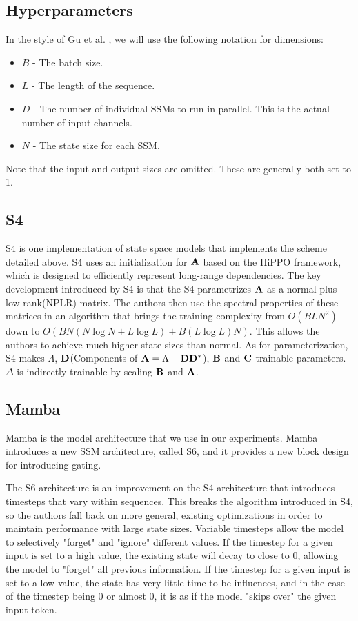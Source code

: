 \subsection{Hyperparameters}
In the style of Gu et al. \cite{s4}, we will use the following notation for
dimensions:
\begin{itemize}
    \item $B$ - The batch size.
    \item $L$ - The length of the sequence.
    \item $D$ - The number of individual SSMs to run in parallel. This is the
    actual number of input channels.
    \item $N$ - The state size for each SSM.
\end{itemize}
Note that the input and output sizes are omitted.
These are generally both set to 1.

\subsection{S4}
S4\cite{s4} is one implementation of state space models that implements the
scheme detailed above.
S4 uses an initialization for ${\mathbf{A}}$ based on the HiPPO framework, which is
designed to efficiently represent long-range dependencies.
The key development introduced by S4 is that the S4 parametrizes ${\mathbf{A}}$ as a
normal-plus-low-rank(NPLR) matrix. The authors then use the spectral properties
of these matrices in an algorithm that brings the training complexity from
$O(BLN^2)$ down to $O(BN(N \log N + L \log L) + B(L \log L)N)$\cite{s4}.
This allows the authors to achieve much higher state sizes than normal.
As for parameterization, S4 makes $\Lambda$, ${\mathbf{D}}$(Components of
${\mathbf{A}} = \Lambda - {\mathbf{D}}{\mathbf{D}}^*$), ${\mathbf{B}}$ and ${\mathbf{C}}$ trainable parameters.
$\Delta$ is indirectly trainable by scaling ${\mathbf{B}}$ and ${\mathbf{A}}$.

\subsection{Mamba}
Mamba\cite{mamba} is the model architecture that we use in our experiments.
Mamba introduces a new SSM architecture, called S6, and it provides a new block
design for introducing gating.

The S6 architecture is an improvement on the S4 architecture that introduces
timesteps that vary within sequences.
This breaks the algorithm introduced in S4, so the authors fall back on more
general, existing optimizations in order to maintain performance with large
state sizes.
Variable timesteps allow the model to selectively "forget" and "ignore"
different values.
If the timestep for a given input is set to a high value, the existing state
will decay to close to 0, allowing the model to "forget" all previous information.
If the timestep for a given input is set to a low value, the state has very little
time to be influences, and in the case of the timestep being 0 or almost 0, it
is as if the model "skips over" the given input token.

